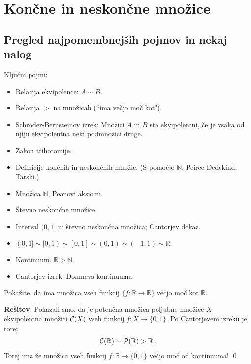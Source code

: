 \documentclass[11pt,paper=b5,footinclude,headinclude]{scrbook} %
\newtheorem{ex}{Vaja\hypertarget{sol:\theex}}[chapter]
\begin{document}
\chapter{Končne in neskončne množice}

\section{Pregled najpomembnejših pojmov in nekaj nalog}

Ključni pojmi:
\begin{itemize}
\item Relacija ekvipolence: $A\sim B$.
\item Relacija $>$ na množicah (``ima večjo moč kot").
\item Schröder-Bernsteinov izrek: Množici $A$ in $B$ sta ekvipolentni, če je vsaka od
njiju ekvipolentna neki podmnožici druge.
\item Zakon trihotomije.
\item Definicije končnih in neskončnih množic. (S pomočjo $\mathbb N$; Peirce-Dedekind; Tarski.)
\item Množica $\mathbb N$, Peanovi aksiomi.
\item Števno neskončne množice.
\item Interval $(0,1]$ ni števno neskončna množica; Cantorjev dokaz.
\item $(0,1]\sim [0,1)\sim [0,1]\sim (0,1)\sim (-1,1)\sim \mathbb{R}$.
\item Kontinuum. $\mathbb{R}>\mathbb{N}$.
\item Cantorjev izrek. Domneva kontinuuma.
\end{itemize}

\begin{ex}
Pokažite, da ima množica vseh funkcij
$\{f:\mathbb{R}\to \mathbb{R}\}$ večjo moč kot $\mathbb{R}$.
\end{ex}


\bigskip
\textbf{Rešitev:} Pokazali smo, da je potenčna množica poljubne množice $X$
ekvipolentna množici ${\cal C}(X)$ vseh funkcij $f:X\to \{0,1\}$.
Po Cantorjevem izreku je torej
$${\cal C}(\mathbb{R})\sim {\cal P}(\mathbb{R})>\mathbb{R}\,.$$
Torej ima že množica vseh funkcij $f:\mathbb{R}\to \{0,1\}$ večjo moč od kontinuuma!
\qed
\end{document}
